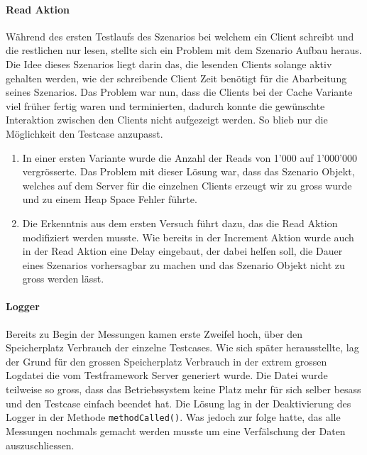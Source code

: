 \paragraph{Read Aktion}
Während des ersten Testlaufs des Szenarios bei welchem ein Client schreibt und die restlichen nur lesen, stellte sich ein Problem mit dem Szenario Aufbau heraus. Die Idee dieses Szenarios liegt darin das, die lesenden Clients solange aktiv gehalten werden, wie der schreibende Client Zeit benötigt für die Abarbeitung seines Szenarios. Das Problem war nun, dass die Clients bei der Cache Variante viel früher fertig waren und terminierten, dadurch konnte die gewünschte Interaktion zwischen den Clients nicht aufgezeigt werden. So blieb nur die Möglichkeit den Testcase anzupasst.
\begin{enumerate}
\item In einer ersten Variante wurde die Anzahl der Reads von 1'000 auf 1'000'000 vergrösserte. Das Problem mit dieser Lösung war, dass das Szenario Objekt, welches auf dem Server für die einzelnen Clients erzeugt wir zu gross wurde und zu einem Heap Space Fehler führte.
\item Die Erkenntnis aus dem ersten Versuch führt dazu, das die Read Aktion modifiziert werden musste. Wie bereits in der Increment Aktion wurde auch in der Read Aktion eine Delay eingebaut, der dabei helfen soll, die Dauer eines Szenarios vorhersagbar zu machen und das Szenario Objekt nicht zu gross werden lässt.
\end{enumerate}

\paragraph{Logger}
Bereits zu Begin der Messungen kamen erste Zweifel hoch, über den Speicherplatz Verbrauch der einzelne Testcases. Wie sich später herausstellte, lag der Grund für den grossen Speicherplatz Verbrauch in der extrem grossen Logdatei die vom Testframework Server generiert wurde. Die Datei wurde teilweise so gross, dass das Betriebssystem keine Platz mehr für sich selber besass und den Testcase einfach beendet hat. Die Lösung lag in der Deaktivierung des Logger in der Methode \verb+methodCalled()+. Was jedoch zur folge hatte, das alle Messungen nochmals gemacht werden musste um eine Verfälschung der Daten auszuschliessen.

